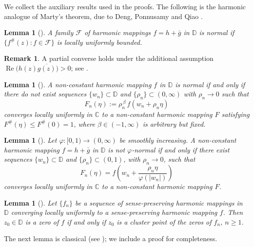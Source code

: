 \documentclass[11pt,reqno]{amsart}
\newtheorem{lemma}[theorem]{Lemma}
\theoremstyle{definition}
\newtheorem{remark}[theorem]{Remark}
\newcommand{\D}{\mathbb{D}}
\newcommand{\C}{\mathbb{C}}
\newcommand{\Real}{\operatorname{Re}}
\begin{document}
We collect the auxiliary results used in the proofs. The following is the harmonic analogue of Marty's theorem, due to Deng, Ponnusamy and Qiao \cite{DPQ}.

\begin{lemma}[{\cite[Lemma~1]{DPQ}}]\label{lem:marty}
A family $\mathcal F$ of harmonic mappings $f=h+\bar g$ in $\D$ is normal if
$\{f^{\#}(z):f\in\mathcal F\}$ is locally uniformly bounded.
\end{lemma}

\begin{remark}\label{rem:martyconverse}
A partial converse holds under the additional assumption $\Real\big(h(z)\overline{g(z)}\big)>0$;
see \cite[Lemma~2.1]{BDP}.
\end{remark}

\begin{lemma}[{\cite[Theorem~1.2]{BT}}]\label{lem:resnormal}
A non-constant harmonic mapping $f$ in $\D$ is normal if and only if there do \emph{not}
exist sequences $\{w_{n}\}\subset\D$ and $\{\rho_{n}\}\subset(0,\infty)$ with $\rho_{n}\to0$
such that
\[
F_{n}(\eta):=\rho_{n}^{\,\beta}\,f(w_{n}+\rho_{n}\eta)
\]
converges locally uniformly in $\C$ to a non-constant harmonic mapping $F$ satisfying
$F^{\#}(\eta)\le F^{\#}(0)=1$, where $\beta\in(-1,\infty)$ is arbitrary but fixed.
\end{lemma}

\begin{lemma}[{\cite[Theorem~1.3]{BDP}}]\label{lem:phizalcman}
Let $\varphi\colon[0,1)\to(0,\infty)$ be smoothly increasing. A non-constant harmonic
mapping $f=h+\bar g$ in $\D$ is \emph{not} $\varphi$-normal if and only if there exist
sequences $\{w_{n}\}\subset\D$ and $\{\rho_{n}\}\subset(0,1)$, with $\rho_{n}\to0$, such that
\[
F_{n}(\eta)=f\!\left(w_{n}+\frac{\rho_{n}\eta}{\varphi(|w_{n}|)}\right)
\]
converges locally uniformly in $\C$ to a non-constant harmonic mapping $F$.
\end{lemma}

\begin{lemma}[{\cite[p.~10]{Duren}}]\label{lem:hurwitz}
Let $\{f_{n}\}$ be a sequence of sense-preserving harmonic mappings in $\D$ converging
locally uniformly to a sense-preserving harmonic mapping $f$. Then $z_{0}\in\D$ is a zero of
$f$ if and only if $z_{0}$ is a cluster point of the zeros of $f_{n}$, $n\ge1$.
\end{lemma}

The next lemma is classical (see \cite{Hayman}); we include a proof for completeness.
\end{document}
